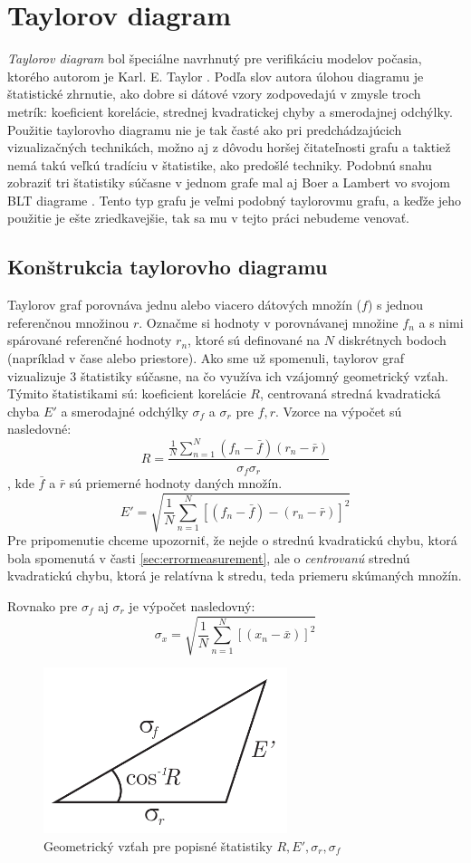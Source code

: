 \section{Taylorov diagram}
\textit{Taylorov diagram} bol špeciálne navrhnutý pre verifikáciu modelov počasia, ktorého autorom je Karl. E. Taylor \cite{Taylor}. Podľa slov autora úlohou diagramu je štatistické zhrnutie, ako dobre si dátové vzory zodpovedajú v zmysle troch metrík: koeficient korelácie, strednej kvadratickej chyby a smerodajnej odchýlky. Použitie taylorovho diagramu nie je tak časté ako pri predchádzajúcich vizualizačných technikách, možno aj z dôvodu horšej čitateľnosti grafu a taktiež nemá takú veľkú tradíciu v štatistike, ako predošlé techniky. Podobnú snahu zobraziť tri štatistiky súčasne v jednom grafe mal aj Boer a Lambert vo svojom BLT diagrame \cite{Boer}. Tento typ grafu je veľmi podobný taylorovmu grafu, a keďže jeho použitie je ešte zriedkavejšie, tak sa mu v tejto práci nebudeme venovať.
  
\subsection{Konštrukcia taylorovho diagramu}
Taylorov graf porovnáva jednu alebo viacero dátových množín ($ f $) s jednou referenčnou množinou $ r $. Označme si hodnoty v porovnávanej množine $ f_{n} $ a s nimi spárované referenčné hodnoty $ r_{n} $, ktoré sú definované na $ N $ diskrétnych bodoch (napríklad v čase alebo priestore). Ako sme už spomenuli, taylorov graf vizualizuje 3 štatistiky súčasne, na čo využíva ich vzájomný geometrický vzťah. Týmito štatistikami sú: koeficient korelácie $ R $, centrovaná stredná kvadratická chyba $ E' $ a smerodajné odchýlky $ \sigma_{f} $ a $ \sigma_{r} $ pre $ f, r $.  Vzorce na výpočet sú nasledovné:
\[
	R = \dfrac{\frac{1}{N} \sum_{n=1}^{N}(f_{n} - \bar{f})(r_{n} - \bar{r})  }{\sigma_{f}\sigma_{r}}
\]
, kde $ \bar{f} $ a $ \bar{r} $ sú priemerné hodnoty daných množín.
\[
	E' = \sqrt{\frac{1}{N} \sum_{n=1}^{N}[(f_{n} - \bar{f}) - (r_{n} - \bar{r})]^2 }
\]
Pre pripomenutie chceme upozorniť, že nejde o strednú kvadratickú chybu, ktorá bola spomenutá v časti \ref{sec:errormeasurement}, ale o \textit{centrovanú} strednú kvadratickú chybu, ktorá je relatívna k stredu, teda priemeru skúmaných množín.

Rovnako pre $ \sigma_{f} $ aj $ \sigma_{r} $ je výpočet nasledovný:
\[
\sigma_{x} = \sqrt{\frac{1}{N} \sum_{n=1}^{N}[(x_{n} - \bar{x})]^2 }
\]

\begin{figure}
	\centering
	\includegraphics[width = 2.8in]{taylortriangle}
	\caption{ Geometrický vzťah pre popisné štatistiky $ R, E', \sigma_{r}, \sigma_{f} $ }
	\label{fig:gemrelationship}
\end{figure}

